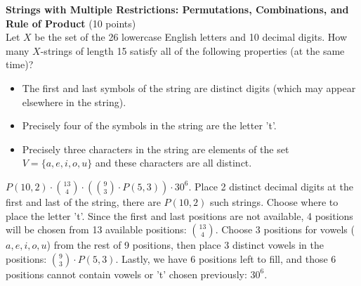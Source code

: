   
  \textbf{Strings with Multiple Restrictions: Permutations, Combinations, and Rule of Product} (10 points)\\
    Let $X$ be the set of the 26 lowercase English letters and 10 decimal digits. How many $X$-strings of length 15 satisfy all of the following properties (at the same time)?
    \begin{itemize}
      \item The first and last symbols of the string are distinct digits (which may appear elsewhere in the string).
      \item Precisely four of the symbols in the string are the letter 't'.
      \item Precisely three characters in the string are elements of the set $V=\{a,e,i,o,u\}$ and these characters are all distinct.
    \end{itemize}
    \begin{subanswer}
      $P(10,2) \cdot \binom{13}{4} \cdot \left(\binom{9}{3} \cdot P(5,3)\right) \cdot 30^6$. Place 2 distinct decimal digits at the first and last of the string, there are $P(10,2)$ such strings. Choose where to place the letter 't'. Since the first and last positions are not available, 4 positions will be chosen from 13 available positions: $\binom{13}{4}$. Choose 3 positions for vowels ($a,e,i,o,u$) from the rest of 9 positions, then place 3 distinct vowels in the positions: $\binom{9}{3} \cdot P(5,3)$. Lastly, we have 6 positions left to fill, and those 6 positions cannot contain vowels or 't' chosen previously: $30^6$.
    \end{subanswer}
  
  
  